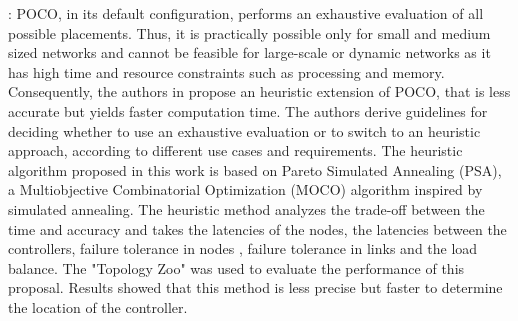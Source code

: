 \documentclass[a4paper,10pt]{article}
\begin{document}


\cite{LaGe15}: POCO, in its default configuration, performs an exhaustive evaluation of all possible placements. Thus, it is practically possible only for small and medium sized networks and cannot be feasible for large-scale or dynamic networks as it has high time and resource constraints such as processing and memory. 
Consequently, the authors in \cite{LaGe15} propose an heuristic extension of POCO, that is less accurate but yields faster computation time. The authors derive guidelines for deciding whether to use an exhaustive evaluation or to switch to an heuristic approach, according to different use cases and requirements. The heuristic algorithm proposed in this work is based on Pareto Simulated Annealing (PSA), a Multiobjective Combinatorial Optimization (MOCO) algorithm inspired by simulated annealing. The heuristic method analyzes the trade-off between the time and accuracy and takes the latencies of the nodes, the latencies between the controllers, failure tolerance in nodes , failure tolerance in links and the load balance. The "Topology Zoo" was used to evaluate the performance of this proposal. Results showed that this method is less precise but faster to determine the location of the controller.
\end{document}
